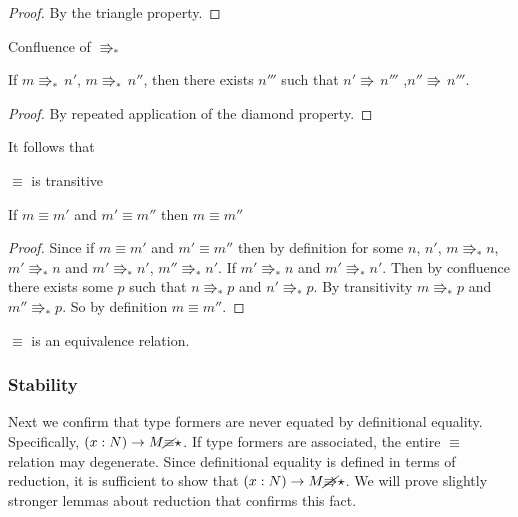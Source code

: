 \begin{proof}
By the triangle property.
\end{proof}
\begin{thm}
Confluence of $\Rrightarrow_{\ast}$
 
If $m\Rrightarrow_{\ast}\,n'$, $m\Rrightarrow_{\ast}\,n''$, then there exists $n'''$ such that $n'\Rrightarrow\,n'''$ ,$n''\Rrightarrow\,n'''$.
\end{thm}
 
\begin{proof}
By repeated application of the diamond property.
\end{proof}
It follows that
\begin{thm}
$\equiv$ is transitive
 
If $m\equiv m'$ and $m'\equiv m''$ then $m\equiv m''$
\end{thm}
 
\begin{proof}
Since if $m\equiv m'$ and $m'\equiv m''$ then by definition for some $n$, $n'$, $m\Rrightarrow_{\ast}n$, $m'\Rrightarrow_{\ast}n$ and $m'\Rrightarrow_{\ast}n'$, $m''\Rrightarrow_{\ast}n'$. If $m'\Rrightarrow_{\ast}n$ and $m'\Rrightarrow_{\ast}n'$.
Then by confluence there exists some $p$ such that $n\Rrightarrow_{\ast}p$ and $n'\Rrightarrow_{\ast}p$.
By transitivity $m\Rrightarrow_{\ast}p$ and $m''\Rrightarrow_{\ast}p$.
So by definition $m\equiv m''$.
\end{proof}
\begin{fact}
$\equiv$ is an equivalence relation.
\end{fact}
 
 
\subsubsection{Stability}
Next we confirm that type formers are never equated by definitional equality.
Specifically, $\left(x:N\right)\rightarrow M\cancel{\equiv}\star$.
If type formers are associated, the entire $\equiv$ relation may degenerate. %
Since definitional equality is defined in terms of reduction, it is sufficient to show that $\left(x:N\right)\rightarrow M\cancel{\Rrightarrow}\star$.
We will prove slightly stronger lemmas about reduction that confirms this fact.
 

